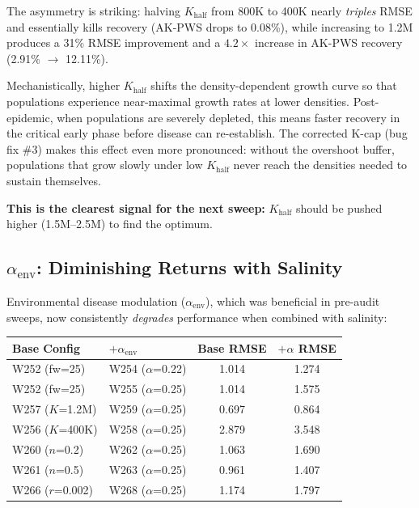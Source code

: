 \documentclass[11pt,a4paper]{article}
\begin{document}
The asymmetry is striking: halving $K_{\text{half}}$ from 800K to 400K nearly \emph{triples} RMSE and essentially kills recovery (AK-PWS drops to 0.08\%), while increasing to 1.2M produces a 31\% RMSE improvement and a $4.2\times$ increase in AK-PWS recovery (2.91\% $\to$ 12.11\%).

Mechanistically, higher $K_{\text{half}}$ shifts the density-dependent growth curve so that populations experience near-maximal growth rates at lower densities. Post-epidemic, when populations are severely depleted, this means faster recovery in the critical early phase before disease can re-establish. The corrected K-cap (bug fix \#3) makes this effect even more pronounced: without the overshoot buffer, populations that grow slowly under low $K_{\text{half}}$ never reach the densities needed to sustain themselves.

\textbf{This is the clearest signal for the next sweep:} $K_{\text{half}}$ should be pushed higher (1.5M--2.5M) to find the optimum.

\subsection{\texorpdfstring{$\alpha_{\text{env}}$}{alpha\_env}: Diminishing Returns with Salinity}

Environmental disease modulation ($\alpha_{\text{env}}$), which was beneficial in pre-audit sweeps, now consistently \emph{degrades} performance when combined with salinity:

\begin{center}
\begin{tabular}{llcc}
\toprule
\textbf{Base Config} & \textbf{$+\alpha_{\text{env}}$} & \textbf{Base RMSE} & \textbf{$+\alpha$ RMSE} \\
\midrule
W252 (fw=25) & W254 ($\alpha$=0.22) & 1.014 & 1.274 \\
W252 (fw=25) & W255 ($\alpha$=0.25) & 1.014 & 1.575 \\
W257 ($K$=1.2M) & W259 ($\alpha$=0.25) & 0.697 & 0.864 \\
W256 ($K$=400K) & W258 ($\alpha$=0.25) & 2.879 & 3.548 \\
W260 ($n$=0.2) & W262 ($\alpha$=0.25) & 1.063 & 1.690 \\
W261 ($n$=0.5) & W263 ($\alpha$=0.25) & 0.961 & 1.407 \\
W266 ($r$=0.002) & W268 ($\alpha$=0.25) & 1.174 & 1.797 \\
\bottomrule
\end{tabular}
\end{center}
\end{document}
